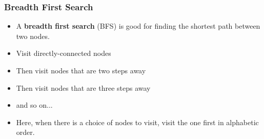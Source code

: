 \documentclass{beamer}
\begin{document}
\begin{frame}
\frametitle{Breadth First Search}
\begin{itemize}
\item A \textbf{breadth first search} (BFS) is good for finding the shortest path between two nodes.
\item Visit directly-connected nodes
\item Then visit nodes that are two steps away
\item Then visit nodes that are three steps away
\item and so on...
\item Here, when there is a choice of nodes to visit, visit the one first in alphabetic order.
\end{itemize}
\end{frame}
\end{document}
